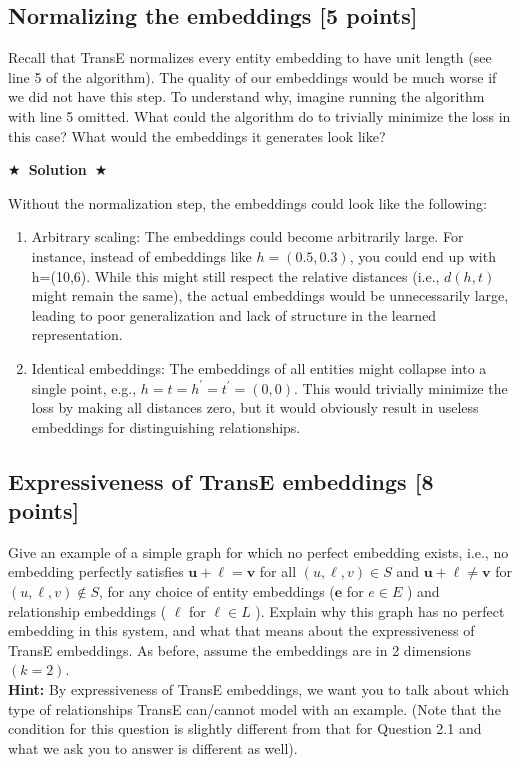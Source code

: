\documentclass[11pt]{article}
\numberwithin{figure}{section}
\newcommand{\Solution}[1]{{\medskip \color{red} \bf $\bigstar$~\sf \textbf{Solution}~$\bigstar$ \sf #1 } \bigskip}
\begin{document}
\subsection{ Normalizing the embeddings [5 points]}
Recall that TransE normalizes every entity embedding to have unit length (see line 5 of the algorithm). The quality of our embeddings would be much worse if we did not have this step. To understand why, imagine running the algorithm with line 5 omitted.
What could the algorithm do to trivially minimize the loss in this case? What would the embeddings
it generates look like?

\Solution{}

Without the normalization step, the embeddings could look like the following:

\begin{enumerate}[label=\textbullet, left=2em]
    \item Arbitrary scaling: The embeddings could become arbitrarily large. For instance, instead of embeddings like $h=\left(0.5,0.3\right)$, you could end up with h=(10,6). While this might still respect the relative distances (i.e., $d\left(h,t\right)$ might remain the same), the actual embeddings would be unnecessarily large, leading to poor generalization and lack of structure in the learned representation.

    \item Identical embeddings: The embeddings of all entities might collapse into a single point, e.g., $h=t=h^{\prime} =t^{\prime}=\left(0,0\right)$. This would trivially minimize the loss by making all distances zero, but it would obviously result in useless embeddings for distinguishing relationships.
\end{enumerate}



\subsection{Expressiveness of TransE embeddings [8 points]}
Give an example of a simple graph for which no perfect embedding exists, i.e., no embedding perfectly satisfies $\mathbf{u}+\boldsymbol{\ell}=\mathbf{v}$ for all $(u, \ell, v) \in S$ and $\mathbf{u}+\boldsymbol{\ell} \neq \mathbf{v}$ for $(u, \ell, v) \notin S$, for any choice of entity embeddings ($\mathbf{e}$ for $e \in E$ ) and relationship embeddings ( $\boldsymbol{\ell}$ for $\ell \in L$ ). Explain why this graph has no perfect embedding in this system, and what that means about the expressiveness of TransE embeddings. As before, assume the embeddings are in 2 dimensions $(k=2)$.\\
\textbf{Hint: }By expressiveness of TransE embeddings, we want you to talk about which type of relationships TransE can/cannot model with an example. (Note that the condition for this question is slightly different from that for Question 2.1 and what we ask you to answer is different as well).
\end{document}
